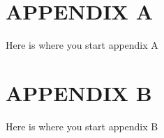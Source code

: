 \headsep 0.8in
\section*{APPENDIX A}
Here is where you start appendix A

\newpage
{}
\headsep 0.8in
\section*{APPENDIX B}
Here is where you start appendix B

